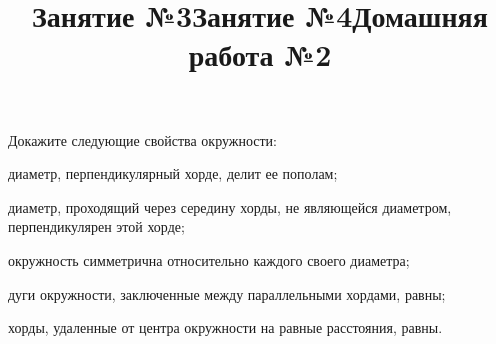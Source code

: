 \newpage
\title{Занятие №3}
\begin{listofex}
	\item Докажите следующие свойства окружности:
	\begin{enumcols}[itemcolumns=1]
		\item диаметр, перпендикулярный хорде, делит ее пополам;
		\item диаметр, проходящий через середину хорды, не являющейся диаметром, перпендикулярен этой хорде;
		\item окружность симметрична относительно каждого своего
		диаметра;
		\item дуги окружности, заключенные между параллельными
		хордами, равны;
		\item хорды, удаленные от центра окружности на равные расстояния, равны.
	\end{enumcols}
	\item {}
	\item {}
	\item {}
	\item {}
	\item {}
\end{listofex}
\newpage
\title{Занятие №4}
\begin{listofex}
	\item {}
	\item {}
	\item {}
	\item {}
	\item {}
\end{listofex}
\newpage
\title{Домашняя работа №2}
\begin{listofex}
	\item {}
	\item {}
	\item {}
	\item {}
	\item {}
	\item {}
	\item {}
	\item {}
\end{listofex}
%
%
%
%
